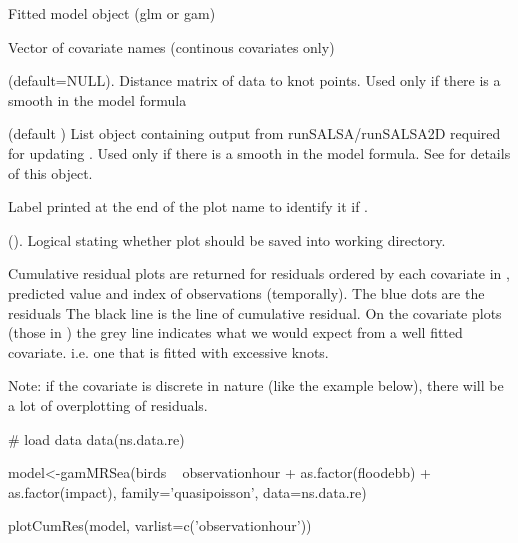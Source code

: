 \documentclass[a4paper]{book}
\begin{document}
%
\begin{Arguments}
\begin{ldescription}
\item[\code{model}] Fitted model object (glm or gam)

\item[\code{varlist}] Vector of covariate names (continous covariates only)

\item[\code{d2k}] (default=NULL).  Distance matrix of data to knot points. Used only if there is a  smooth in the model formula

\item[\code{splineParams}] (default ) List object containing output from runSALSA/runSALSA2D required for updating .  Used only if there is a  smooth in the model formula. See  for details of this object.

\item[\code{label}] Label printed at the end of the plot name to identify it if .

\item[\code{save}] (). Logical stating whether plot should be saved into working directory.
\end{ldescription}
\end{Arguments}
%
\begin{Value}
Cumulative residual plots are returned for residuals ordered by each covariate in , predicted value and index of observations (temporally).
The blue dots are the residuals
The black line is the line of cumulative residual.
On the covariate plots (those in ) the grey line indicates what we would expect from a well fitted covariate. i.e. one that is fitted with excessive knots.

Note: if the covariate is discrete in nature (like the example below), there will be a lot of overplotting of residuals.
\end{Value}
%
\begin{Examples}
\begin{ExampleCode}
# load data
data(ns.data.re)

model<-gamMRSea(birds ~ observationhour + as.factor(floodebb) + as.factor(impact), 
           family='quasipoisson', data=ns.data.re)

plotCumRes(model, varlist=c('observationhour'))

\end{ExampleCode}
\end{Examples}
\end{document}

